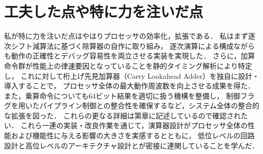 \documentclass[autodetect-engine,dvi=dvipdfmx,ja=standard,
               a4j,11pt]{bxjsarticle}
\begin{document}
\section{工夫した点や特に力を注いだ点}
私が特に力を注いだ点はやはりプロセッサの効率化，拡張である．
私はまず逐次シフト減算法に基づく除算器の自作に取り組み，
逐次演算による構成ながらも動作の正確性とデバッグ容易性を両立させる実装を実現した．
さらに，加算命令群が性能上の律速要因となっていることを静的タイミング解析により特定し，
これに対して桁上げ先見加算器（Carry Lookahead Adder）を独自に設計・導入することで，
プロセッサ全体の最大動作周波数を向上させる成果を得た．また，乗算命令についても64ビット結果を適切に扱う機構を整備し，
制御フラグを用いたパイプライン制御との整合性を確保するなど，システム全体の整合的な拡張を図った．
これらの更なる詳細は第章に記述しているので確認されたい．
これら一連の実装・改良作業を通じて，演算器設計がプロセッサ全体の性能および機能性に与える影響の大きさを実感するとともに，
低位レベルの回路設計と高位レベルのアーキテクチャ設計とが密接に連関していることを学んだ．
\end{document}
